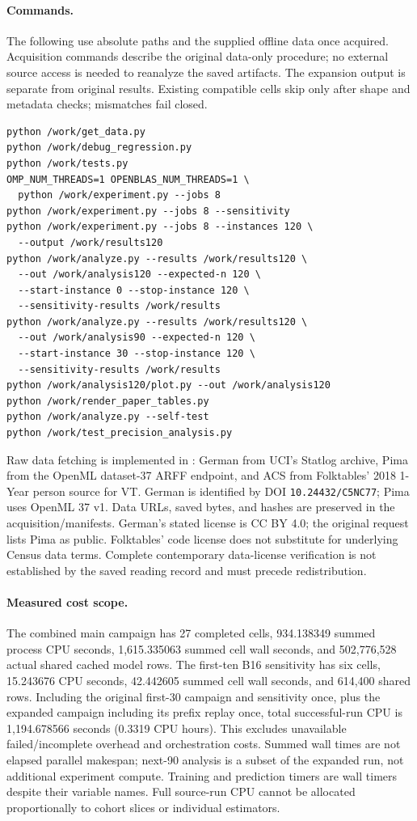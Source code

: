 \documentclass{article}
\DeclareRobustCommand{\artifact}[1]{\path{#1}}
\begin{document}
\paragraph{Commands.}
The following use absolute paths and the supplied offline data once acquired. Acquisition commands describe the original data-only procedure; no external source access is needed to reanalyze the saved artifacts. The expansion output is separate from original results. Existing compatible cells skip only after shape and metadata checks; mismatches fail closed.
\begin{verbatim}
python /work/get_data.py
python /work/debug_regression.py
python /work/tests.py
OMP_NUM_THREADS=1 OPENBLAS_NUM_THREADS=1 \
  python /work/experiment.py --jobs 8
python /work/experiment.py --jobs 8 --sensitivity
python /work/experiment.py --jobs 8 --instances 120 \
  --output /work/results120
python /work/analyze.py --results /work/results120 \
  --out /work/analysis120 --expected-n 120 \
  --start-instance 0 --stop-instance 120 \
  --sensitivity-results /work/results
python /work/analyze.py --results /work/results120 \
  --out /work/analysis90 --expected-n 120 \
  --start-instance 30 --stop-instance 120 \
  --sensitivity-results /work/results
python /work/analysis120/plot.py --out /work/analysis120
python /work/render_paper_tables.py
python /work/analyze.py --self-test
python /work/test_precision_analysis.py
\end{verbatim}
Raw data fetching is implemented in \artifact{get_data.py}: German from UCI's Statlog archive, Pima from the OpenML dataset-37 ARFF endpoint, and ACS from Folktables' 2018 1-Year person source for VT. German is identified by DOI \texttt{10.24432/C5NC77}; Pima uses OpenML 37 v1. Data URLs, saved bytes, and hashes are preserved in the acquisition/manifests. German's stated license is CC BY 4.0; the original request lists Pima as public. Folktables' code license does not substitute for underlying Census data terms. Complete contemporary data-license verification is not established by the saved reading record and must precede redistribution.

\paragraph{Measured cost scope.}
The combined main campaign has 27 completed cells, 934.138349 summed process CPU seconds, 1,615.335063 summed cell wall seconds, and 502,776,528 actual shared cached model rows. The first-ten B16 sensitivity has six cells, 15.243676 CPU seconds, 42.442605 summed cell wall seconds, and 614,400 shared rows. Including the original first-30 campaign and sensitivity once, plus the expanded campaign including its prefix replay once, total successful-run CPU is 1,194.678566 seconds (0.3319 CPU hours). This excludes unavailable failed/incomplete overhead and orchestration costs. Summed wall times are not elapsed parallel makespan; next-90 analysis is a subset of the expanded run, not additional experiment compute. Training and prediction timers are wall timers despite their variable names. Full source-run CPU cannot be allocated proportionally to cohort slices or individual estimators.
\end{document}
